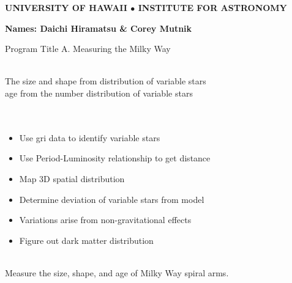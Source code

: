 \documentclass[letterpaper,11pt]{article}
\begin{document}
\pagestyle{plain}

\begin{center} 
\bfseries\uppercase{University of Hawaii $\bullet$ Institute for Astronomy}
\end{center}
\vspace{-0.3cm}
\centerline{\bf Names: {Daichi Hiramatsu} \& {Corey Mutnik}}
 

Program Title
A. Measuring the Milky Way

\smallskip\\
The size and shape from distribution of variable stars\\
age from the number distribution of variable stars\\




\smallskip\\
\smallskip\\
\begin{itemize}
	\item{} Use gri data to identify variable stars
	\item{} Use Period-Luminosity relationship to get distance
	\item{} Map 3D spatial distribution
	\item{} Determine deviation of variable stars from model
	\item{} Variations arise from non-gravitational effects
	\item{} Figure out dark matter distribution
\end{itemize}


\smallskip\\
Measure the size, shape, and age of Milky Way spiral arms.  \\
\smallskip\\
\\
\end{document}
